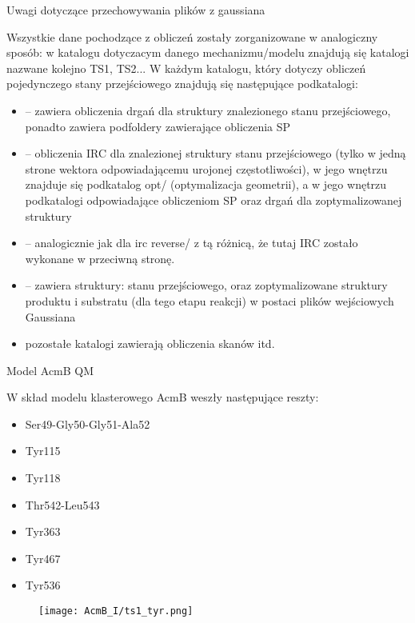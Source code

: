 \documentclass[10pt,a4paper]{article}
\begin{document}


\begin{section}{Uwagi dotyczące przechowywania plików z gaussiana}

Wszystkie dane pochodzące z obliczeń zostały zorganizowane w analogiczny sposób: w katalogu dotyczacym danego mechanizmu/modelu znajdują się katalogi nazwane kolejno TS1, TS2...
W każdym katalogu, który dotyczy obliczeń pojedynczego stany przejściowego znajdują się następujące podkatalogi:
\begin{itemize}
 \item {} -- zawiera obliczenia drgań dla struktury znalezionego stanu przejściowego, ponadto zawiera podfoldery zawierające obliczenia SP
 \item {} -- obliczenia IRC dla znalezionej struktury stanu przejściowego (tylko w jedną strone wektora odpowiadającemu urojonej częstotliwości), w jego wnętrzu znajduje
 się podkatalog opt/ (optymalizacja geometrii), a w jego wnętrzu podkatalogi odpowiadające obliczeniom SP oraz drgań dla zoptymalizowanej struktury
 \item {} -- analogicznie jak dla irc reverse/ z tą różnicą, że tutaj IRC zostało wykonane w przeciwną stronę.
 \item {} -- zawiera struktury: stanu przejściowego, oraz zoptymalizowane struktury produktu i substratu (dla tego etapu reakcji) w postaci plików wejściowych Gaussiana
 \item pozostałe katalogi zawierają obliczenia skanów itd.
\end{itemize}

 
\end{section}













\begin{section}{Model AcmB QM}

W skład modelu klasterowego AcmB weszły następujące reszty:
\begin{itemize}
 \item Ser49-Gly50-Gly51-Ala52
 \item Tyr115
 \item Tyr118
 \item Thr542-Leu543
 \item Tyr363
 \item Tyr467
 \item Tyr536
\end{itemize}

 \begin{figure}[H]
  \texttt{[image: AcmB\_I/ts1\_tyr.png]}
\end{figure}
 
\end{section}
\end{document}
